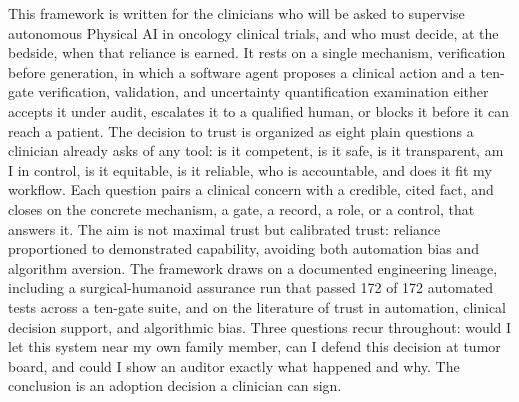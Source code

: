 This framework is written for the clinicians who will be asked to supervise
autonomous Physical AI in oncology clinical trials, and who must decide, at the
bedside, when that reliance is earned. It rests on a single mechanism, verification
before generation, in which a software agent proposes a clinical action and a
ten-gate verification, validation, and uncertainty quantification examination
either accepts it under audit, escalates it to a qualified human, or blocks it
before it can reach a patient. The decision to trust is organized as eight plain
questions a clinician already asks of any tool: is it competent, is it safe, is it
transparent, am I in control, is it equitable, is it reliable, who is accountable,
and does it fit my workflow. Each question pairs a clinical concern with a
credible, cited fact, and closes on the concrete mechanism, a gate, a record, a
role, or a control, that answers it. The aim is not maximal trust but calibrated
trust: reliance proportioned to demonstrated capability, avoiding both automation
bias and algorithm aversion. The framework draws on a documented engineering
lineage, including a surgical-humanoid assurance run that passed 172 of 172
automated tests across a ten-gate suite, and on the literature of trust in
automation, clinical decision support, and algorithmic bias. Three questions recur
throughout: would I let this system near my own family member, can I defend this
decision at tumor board, and could I show an auditor exactly what happened and why.
The conclusion is an adoption decision a clinician can sign.
